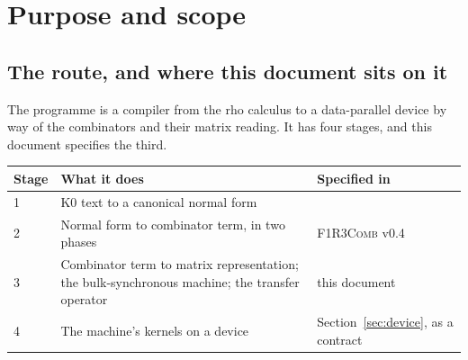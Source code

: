 \documentclass[11pt,a4paper]{article}
\newcommand{\Comb}{\textsc{F1R3Comb}}
\newcommand{\MUST}{\textsc{must}}
\newcommand{\MUSTNOT}{\textsc{must not}}
\newcommand{\SHOULD}{\textsc{should}}
\newcommand{\MAY}{\textsc{may}}
\newcommand{\ev}{\mathsf{e}}
\theoremstyle{definition}
\theoremstyle{plain}
\begin{document}
\begin{abstract}
v0.2 therefore supports both erections: the literal one, because it is what
\Comb{} emits today and the machine must be able to show what it does, and
single-input instantiation, behind a feature, as the construction the device
path is built for. It generates its rule table from \Comb's shape table, makes
the row width a per-artefact parameter, adopts \Comb's address allocator and
freshness checks, adds an instance-provenance column for tracing and for a
cross-instance resolver, and records that the operator layer's closure applies
to no compiled program with an input, since every one contains $\ev$. The
three errata v0.1 raised against the notes are discharged by their revisions;
the questions this version puts to the papers are about phase two.
Key words \MUST, \MUSTNOT, \SHOULD, \MAY{} are used in the sense of RFC~2119.
\end{abstract}

\tableofcontents

\section{Purpose and scope}\label{sec:purpose}

\subsection{The route, and where this document sits on it}

The programme is a compiler from the rho calculus to a data-parallel device
by way of the combinators and their matrix reading. It has four stages, and
this document specifies the third.
\begin{center}
\begin{tabularx}{\linewidth}{@{}l>{\raggedright\arraybackslash}Xl@{}}
\toprule
Stage & What it does & Specified in\\
\midrule
1 & K0 text to a canonical normal form & \cite{k1ndl1ng}\\
2 & Normal form to combinator term, in two phases & \Comb{} v0.4 \cite{combspec}\\
3 & Combinator term to matrix representation; the bulk-synchronous machine;
    the transfer operator & this document\\
4 & The machine's kernels on a device & Section~\ref{sec:device}, as a
    contract\\
\bottomrule
\end{tabularx}
\end{center}
\end{document}
